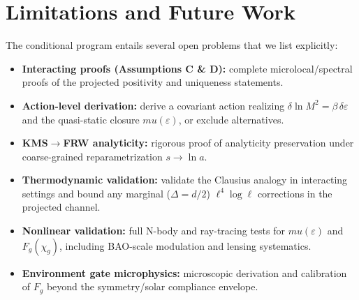 \documentclass[aps,prd,onecolumn,superscriptaddress,nofootinbib]{revtex4-2}
\def\mu{mu}%
\begin{document}
\section{Limitations and Future Work}
\label{sec:limitations}
The conditional program entails several open problems that we list explicitly:
\begin{itemize}[leftmargin=*]
\item \textbf{Interacting proofs (Assumptions C \& D):} complete microlocal/spectral proofs of the projected positivity and uniqueness statements.
\item \textbf{Action-level derivation:} derive a covariant action realizing \(\delta\!\ln M^2=\beta\,\delta\varepsilon\) and the quasi-static closure \(\mu(\varepsilon)\), or exclude alternatives.
\item \textbf{KMS\(\to\)FRW analyticity:} rigorous proof of analyticity preservation under coarse-grained reparametrization \(s\to\ln a\).
\item \textbf{Thermodynamic validation:} validate the Clausius analogy in interacting settings and bound any marginal (\(\Delta=d/2\)) \(\ell^4\log\ell\) corrections in the projected channel.
\item \textbf{Nonlinear validation:} full N-body and ray-tracing tests for \(\mu(\varepsilon)\) and \(F_g(\chi_g)\), including BAO-scale modulation and lensing systematics.
\item \textbf{Environment gate microphysics:} microscopic derivation and calibration of \(F_g\) beyond the symmetry/solar compliance envelope.
\end{itemize}
\end{document}
